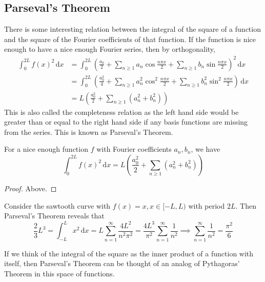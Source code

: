\subsection{Parseval's Theorem}
There is some interesting relation between the integral of the square of a function and the square of the Fourier coefficients of that function.
If the function is nice enough to have a nice enough Fourier series, then by orthogonality,
\begin{align*}
    \int_0^{2L}f(x)^2\,\mathrm dx&=\int_0^{2L}\left( \frac{a_0}{2}+\sum_{n\ge 1}a_n\cos\frac{n\pi x}{2}+\sum_{n\ge 1}b_n\sin\frac{n\pi x}{2} \right)^2\,\mathrm dx\\
    &=\int_0^{2L}\left( \frac{a_0^2}{4}+\sum_{n\ge 1}a_n^2\cos^2\frac{n\pi x}{2}+\sum_{n\ge 1}b_n^2\sin^2\frac{n\pi x}{2} \right)\,\mathrm dx\\
    &=L\left( \frac{a_0^2}{2}+\sum_{n\ge 1}(a_n^2+b_n^2) \right)
\end{align*}
This is also called the completeness relation as the left hand side would be greater than or equal to the right hand side if any basis functions are missing from the series.
This is known as Parseval's Theorem.
\begin{theorem}\label{parseval}
    For a nice enough function $f$ with Fourier coefficients $a_n,b_n$, we have
    $$\int_0^{2L}f(x)^2\,\mathrm dx=L\left( \frac{a_0^2}{2}+\sum_{n\ge 1}(a_n^2+b_n^2) \right)$$
\end{theorem}
\begin{proof}
    Above.
\end{proof}
\begin{example}
    Consider the sawtooth curve with $f(x)=x,x\in[-L,L)$ with period $2L$.
    Then Parseval's Theorem reveals that
    $$\frac{2}{3}L^3=\int_{-L}^Lx^2\,\mathrm dx=L\sum_{n=1}^\infty\frac{4L^2}{n^2\pi^2}=\frac{4L^3}{\pi^2}\sum_{n=1}^\infty\frac{1}{n^2}\implies \sum_{n=1}^\infty\frac{1}{n^2}=\frac{\pi^2}{6}$$
\end{example}
\begin{remark}
    If we think of the integral of the square as the inner product of a function with itself, then Parseval's Theorem can be thought of an analog of Pythagoras' Theorem in this space of functions.
\end{remark}

